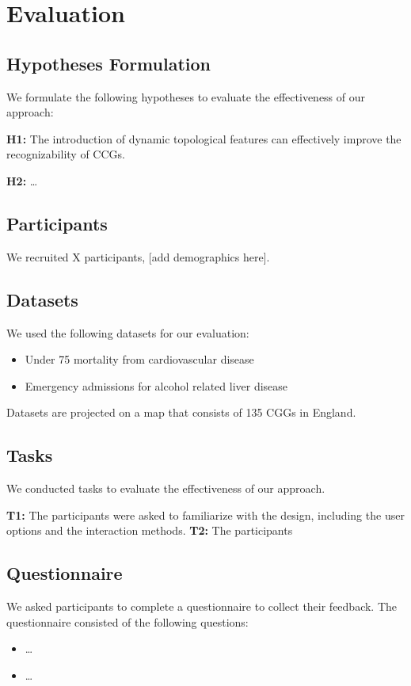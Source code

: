 \color{blue}

\section{Evaluation}

\subsection{Hypotheses Formulation}

We formulate the following hypotheses to evaluate the effectiveness of our approach:

\textbf{H1:} The introduction of dynamic topological features can effectively improve the recognizability of CCGs.

\textbf{H2:} \dots

\subsection{Participants}

We recruited X participants, [add demographics here].

\subsection{Datasets}

We used the following datasets for our evaluation:

\begin{itemize}
    \item Under 75 mortality from cardiovascular disease
    \item Emergency admissions for alcohol related liver disease
\end{itemize}

Datasets are projected on a map that consists of 135 CGGs in England.

\subsection{Tasks}

We conducted tasks to evaluate the effectiveness of our approach.

\textbf{T1:} The participants were asked to familiarize with the design, including the user options and the interaction methods.
\textbf{T2:} The participants 


\subsection{Questionnaire}

We asked participants to complete a questionnaire to collect their feedback. The questionnaire consisted of the following questions:

\begin{itemize}
    \item \dots
    \item \dots
\end{itemize}

\color{black}